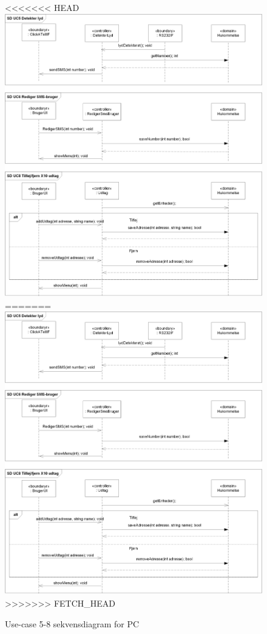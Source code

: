 \begin{figure}[!htb]
<<<<<<< HEAD
     {\includegraphics[width=\textwidth]{billeder/uml/PC_SD2}}
=======
     \includegraphics{billeder/uml/PC_SD2}
>>>>>>> FETCH_HEAD
     \caption{Use-case 5-8 sekvensdiagram for PC}
     \label{fig:PC_SD2}
\end{figure}


